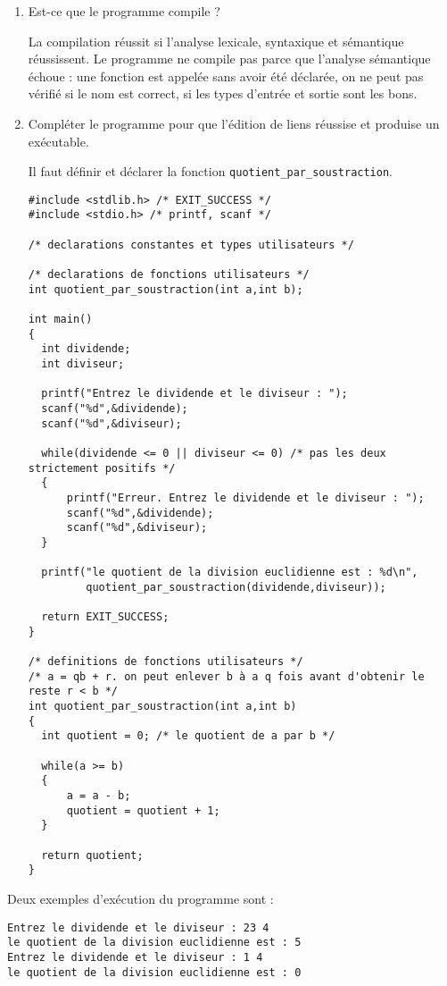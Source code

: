 \begin{enumerate}
\item Est-ce que le programme compile ?
\begin{correction}
La compilation réussit si l'analyse lexicale, syntaxique et sémantique réussissent. Le programme ne compile pas parce que l'analyse sémantique échoue : une fonction est appelée sans avoir été déclarée, on ne peut pas vérifié si le nom est correct, si les types d'entrée et sortie sont les bons.       
\end{correction}
\item Compléter le programme pour que l'édition de liens réussise et produise un exécutable.
  \begin{correction}
Il faut définir et déclarer la fonction \verb|quotient_par_soustraction|.
\begin{verbatim}
#include <stdlib.h> /* EXIT_SUCCESS */
#include <stdio.h> /* printf, scanf */

/* declarations constantes et types utilisateurs */

/* declarations de fonctions utilisateurs */
int quotient_par_soustraction(int a,int b);

int main()
{
  int dividende;
  int diviseur;

  printf("Entrez le dividende et le diviseur : ");
  scanf("%d",&dividende);
  scanf("%d",&diviseur);

  while(dividende <= 0 || diviseur <= 0) /* pas les deux strictement positifs */
  {
      printf("Erreur. Entrez le dividende et le diviseur : ");
      scanf("%d",&dividende);
      scanf("%d",&diviseur);
  }

  printf("le quotient de la division euclidienne est : %d\n",
         quotient_par_soustraction(dividende,diviseur));

  return EXIT_SUCCESS;
}

/* definitions de fonctions utilisateurs */
/* a = qb + r. on peut enlever b à a q fois avant d'obtenir le reste r < b */
int quotient_par_soustraction(int a,int b)
{
  int quotient = 0; /* le quotient de a par b */

  while(a >= b)
  {
      a = a - b;
      quotient = quotient + 1;
  }

  return quotient;
}
\end{verbatim}
\end{correction}
\end{enumerate}

Deux exemples d'exécution du programme sont :
\begin{verbatim}
Entrez le dividende et le diviseur : 23 4
le quotient de la division euclidienne est : 5
Entrez le dividende et le diviseur : 1 4
le quotient de la division euclidienne est : 0
\end{verbatim}

